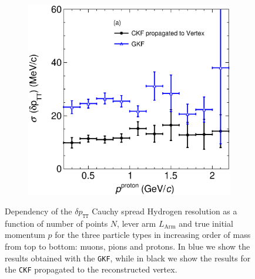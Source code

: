 \begin{figure}[t]
\begin{subfigure}[b]{0.32\textwidth}
         \caption{}
        \label{fig:deltapTTVSlArmMC2212.eps}
     \end{subfigure}
     \begin{subfigure}[b]{0.32\textwidth}
         \centering
         \includegraphics[width=\textwidth]{figures/ch6-TKI/2D/deltapTTVSp2212.eps}
         \caption{}
         \label{fig:deltapTTVSp2212.eps}
     \end{subfigure}
        \caption{Dependency of the $\delta p_\texttt{TT}$ Cauchy spread Hydrogen resolution as a function of number of points $N$, lever arm $L_\text{Arm}$ and true initial momentum $p$ for the three particle types in increasing order of mass from top to bottom: muons, pions and protons. In blue we show the results obtained with the \texttt{GKF}, while in black we show the results for the \texttt{CKF} propagated to the reconstructed vertex.} \label{fig:dpTTVSpart}
\end{figure}

